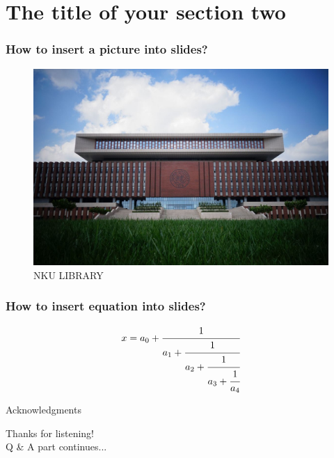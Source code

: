 \documentclass[11pt, dvipsnames]{beamer}
\begin{document}
	\section{The title of your section two}
	\begin{frame}
		\frametitle{How to insert a picture into slides?}
		\begin{figure}
			\centering
			\includegraphics[width=0.7\linewidth]{nkulib}
			\caption{NKU LIBRARY}
			\label{fig:nkulib}
		\end{figure}
		
	\end{frame}
	\begin{frame}
		\frametitle{How to insert equation into slides?}
		\begin{equation}
			x = a_0 + \cfrac{1}{a_1 
				+ \cfrac{1}{a_2 
					+ \cfrac{1}{a_3 + \cfrac{1}{a_4} } } }
		\end{equation}
	\end{frame}
	\begin{frame}{Acknowledgments}
		\begin{center}
			{
				\Large 
				Thanks for listening! \\ 
				\bigskip
				Q \& A part continues...
			}
		\end{center}
	\end{frame}
	
\end{document}
